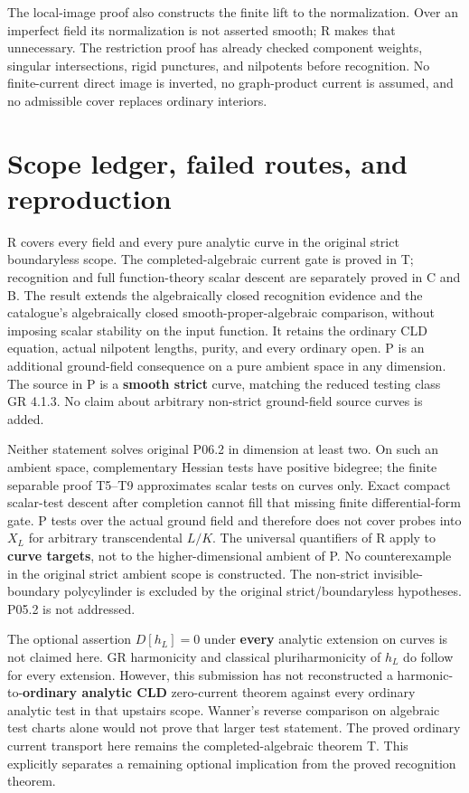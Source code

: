 \documentclass[
  10pt,
]{article}
\begin{document}
The local-image proof also constructs the finite lift to the
normalization. Over an imperfect field its normalization is not asserted
smooth; R makes that unnecessary. The restriction proof has already
checked component weights, singular intersections, rigid punctures, and
nilpotents before recognition. No finite-current direct image is
inverted, no graph-product current is assumed, and no admissible cover
replaces ordinary interiors.

\section{Scope ledger, failed routes, and
reproduction}\label{scope-ledger-failed-routes-and-reproduction}

R covers every field and every pure analytic curve in the original
strict boundaryless scope. The completed-algebraic current gate is
proved in T; recognition and full function-theory scalar descent are
separately proved in C and B. The result extends the algebraically
closed recognition evidence and the catalogue's algebraically closed
smooth-proper-algebraic comparison, without imposing scalar stability on
the input function. It retains the ordinary CLD equation, actual
nilpotent lengths, purity, and every ordinary open. P is an additional
ground-field consequence on a pure ambient space in any dimension. The
source in P is a \textbf{smooth strict} curve, matching the reduced
testing class GR 4.1.3. No claim about arbitrary non-strict ground-field
source curves is added.

Neither statement solves original P06.2 in dimension at least two. On
such an ambient space, complementary Hessian tests have positive
bidegree; the finite separable proof T5--T9 approximates scalar tests on
curves only. Exact compact scalar-test descent after completion cannot
fill that missing finite differential-form gate. P tests over the actual
ground field and therefore does not cover probes into \(X_L\) for
arbitrary transcendental \(L/K\). The universal quantifiers of R apply
to \textbf{curve targets}, not to the higher-dimensional ambient of P.
No counterexample in the original strict ambient scope is constructed.
The non-strict invisible-boundary polycylinder is excluded by the
original strict/boundaryless hypotheses. P05.2 is not addressed.

The optional assertion \(D[h_L]=0\) under \textbf{every} analytic
extension on curves is not claimed here. GR harmonicity and classical
pluriharmonicity of \(h_L\) do follow for every extension. However, this
submission has not reconstructed a harmonic-to-\textbf{ordinary analytic
CLD} zero-current theorem against every ordinary analytic test in that
upstairs scope. Wanner's reverse comparison on algebraic test charts
alone would not prove that larger test statement. The proved ordinary
current transport here remains the completed-algebraic theorem T. This
explicitly separates a remaining optional implication from the proved
recognition theorem.
\end{document}
